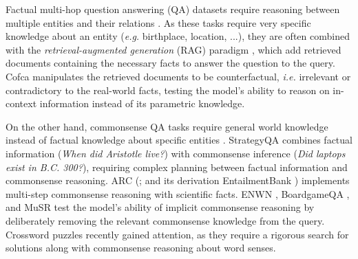 Factual multi-hop question answering (QA) datasets require reasoning between multiple entities and their relations \citep{joshi-etal-2017-triviaqa, yang-etal-2018-hotpotqa, trivedi-etal-2022-musique}. 
As these tasks require very specific knowledge about an entity (\textit{e.g.} birthplace, location, ...), they are often combined with the \textit{retrieval-augmented generation} (RAG) paradigm \citep{NEURIPS2020_6b493230}, which add retrieved documents containing the necessary facts to answer the question to the query. Cofca \citep{wu2024cofcastepwisecounterfactualmultihop} manipulates the retrieved documents to be counterfactual, \textit{i.e.} irrelevant or contradictory to the real-world facts, testing the model's ability to reason on in-context information instead of its parametric knowledge.

On the other hand, commonsense QA tasks require general world knowledge instead of factual knowledge about specific entities \citep{talmor-etal-2019-commonsenseqa, }. StrategyQA \citep{geva-etal-2021-aristotle} combines factual information (\textit{When did Aristotle live?}) with commonsense inference (\textit{Did laptops exist in B.C. 300?}), requiring complex planning between factual information and commonsense reasoning. ARC (\citet{clark2018thinksolvedquestionanswering}; and its derivation EntailmentBank \citep{dalvi-etal-2021-explaining}) implements multi-step commonsense reasoning with scientific facts. ENWN \citep{sprague-etal-2022-natural}, BoardgameQA \citep{NEURIPS2023_7adce80e}, and MuSR \citep{DBLP:conf/iclr/SpragueYBCD24} test the model's ability of implicit commonsense reasoning by deliberately removing the relevant commonsense knowledge from the query. Crossword puzzles \citep{NEURIPS2023_271db992} recently gained attention, as they require a rigorous search for solutions along with commonsense reasoning about word senses.

